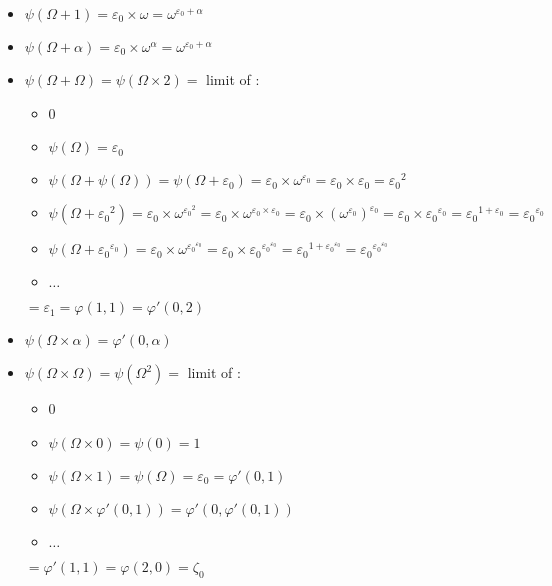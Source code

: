 \documentclass[10pt]{article}
\begin{document}
\begin{itemize}
     \setlength{\itemsep}{1pt}
     \setlength{\parskip}{0pt}
     \setlength{\parsep}{0pt}

\item \( \psi(\Omega+1) = \varepsilon_0 \times \omega = \omega^{\varepsilon_0+\alpha} \)

\item \( \psi(\Omega+\alpha) = \varepsilon_0 \times \omega^\alpha = \omega^{\varepsilon_0+\alpha} \)

\item \( \psi(\Omega+\Omega) = \psi(\Omega \times 2) = \) limit of : 
   \begin{itemize}
     \setlength{\itemsep}{1pt}
     \setlength{\parskip}{0pt}
     \setlength{\parsep}{0pt}
   \item 0
   \item \( \psi(\Omega) = \varepsilon_0 \)
   \item \( \psi(\Omega+\psi(\Omega)) = \psi(\Omega+\varepsilon_0) = \varepsilon_0 \times \omega^{\varepsilon_0} = \varepsilon_0 \times \varepsilon_0 = {\varepsilon_0}^2 \)
   \item \( \psi(\Omega+{\varepsilon_0}^2) = \varepsilon_0 \times \omega^{{\varepsilon_0}^2} = \varepsilon_0 \times \omega^{\varepsilon_0 \times \varepsilon_0} = \varepsilon_0 \times (\omega^{\varepsilon_0})^{\varepsilon_0} = \varepsilon_0 \times {\varepsilon_0}^{\varepsilon_0} = {\varepsilon_0}^{1+\varepsilon_0} = {\varepsilon_0}^{\varepsilon_0} \)
   \item \( \psi(\Omega+{\varepsilon_0}^{\varepsilon_0}) = \varepsilon_0 \times \omega^{{\varepsilon_0}^{\varepsilon_0}} = \varepsilon_0 \times {\varepsilon_0}^{{\varepsilon_0}^{\varepsilon_0}} = {\varepsilon_0}^{1+{\varepsilon_0}^{\varepsilon_0}} = {\varepsilon_0}^{{\varepsilon_0}^{\varepsilon_0}} \)
   \item \( \ldots \)
   \end{itemize}
   \( = \varepsilon_1 = \varphi(1,1) = \varphi'(0,2) \)

\item \( \psi(\Omega \times \alpha) = \varphi'(0,\alpha) \)

\item \( \psi(\Omega \times \Omega) = \psi(\Omega^2) = \) limit of : 
   \begin{itemize}
     \setlength{\itemsep}{1pt}
     \setlength{\parskip}{0pt}
     \setlength{\parsep}{0pt}
   \item 0
   \item \( \psi(\Omega \times 0) = \psi(0) = 1 \)
   \item \( \psi(\Omega \times 1) = \psi(\Omega) = \varepsilon_0 = \varphi'(0,1) \)
   \item \( \psi(\Omega \times \varphi'(0,1)) = \varphi'(0,\varphi'(0,1)) \)
   \item \( \ldots \)
   \end{itemize}
   \( = \varphi'(1,1) = \varphi(2,0) = \zeta_0 \)


\end{itemize}
\end{document}
